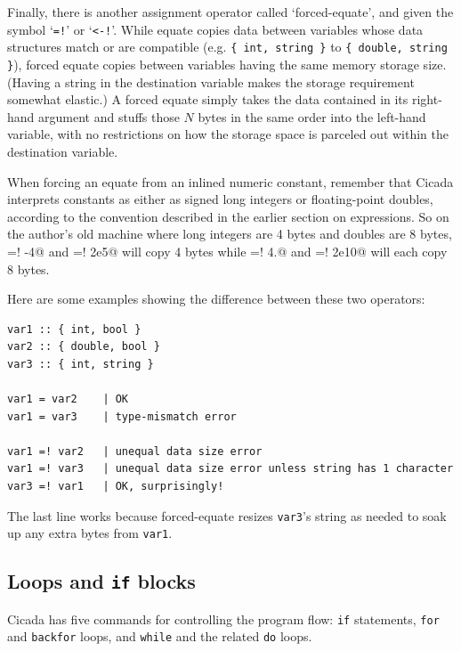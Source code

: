 \documentclass{article}
\newenvironment{code}{
       \begin{list}{}{
               \setlength{\leftmargin}{.4in}
               \setlength{\rightmargin}{0in}
               \setlength{\topsep}{.2in}
       }
       \small
       \item[] }
       { \end{list}   }
\begin{document}
Finally, there is another assignment operator called `forced-equate', and given the symbol `\texttt{=!}' or `\verb#<-!#'.  While equate copies data between variables whose data structures match or are compatible (e.g. \verb#{ int, string }# to \verb#{ double, string }#), forced equate copies between variables having the same memory storage size.  (Having a string in the destination variable makes the storage requirement somewhat elastic.)  A forced equate simply takes the data contained in its right-hand argument and stuffs those $N$ bytes in the same order into the left-hand variable, with no restrictions on how the storage space is parceled out within the destination variable.

When forcing an equate from an inlined numeric constant, remember that Cicada interprets constants as either as signed long integers or floating-point doubles, according to the convention described in the earlier section on expressions.  So on the author's old machine where long integers are 4 bytes and doubles are 8 bytes, \verb@a =! -4@ and \verb@a =! 2e5@ will copy 4 bytes while \verb@a =! 4.@ and \verb@a =! 2e10@ will each copy 8 bytes.

Here are some examples showing the difference between these two operators:

\begin{code} \begin{verbatim}
var1 :: { int, bool }
var2 :: { double, bool }
var3 :: { int, string }

var1 = var2    | OK
var1 = var3    | type-mismatch error

var1 =! var2   | unequal data size error
var1 =! var3   | unequal data size error unless string has 1 character
var3 =! var1   | OK, surprisingly!
\end{verbatim} \end{code}

\noindent The last line works because forced-equate resizes \verb#var3#'s string as needed to soak up any extra bytes from \verb#var1#.






\subsection{Loops and \texttt{if} blocks} 

Cicada has five commands for controlling the program flow:  \texttt{if} statements, \texttt{for} and \verb$backfor$ loops, and \texttt{while} and the related \texttt{do} loops.
\end{document}
